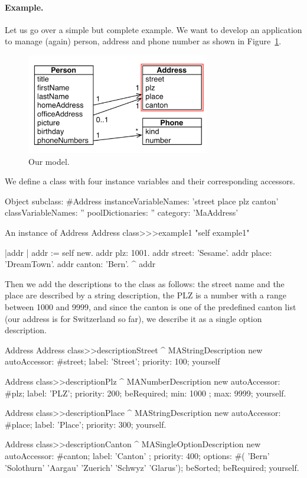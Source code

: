 \documentclass[a4paper,10pt,twoside]{book}
\begin{document}
\paragraph{Example.} Let us go over a simple but complete example. We want to develop an application to manage (again) person, address and phone number as shown in Figure~\ref{fig:address}. 

\begin{figure}
\begin{center}
\includegraphics[width=8cm]{address}
\caption{Our model. \label{fig:address}}
\end{center}
\end{figure}

We define a class  with four instance variables and their corresponding accessors. 

\begin{classdef}{}
Object subclass: #Address
	instanceVariableNames: 'street place plz canton'
	classVariableNames: ''
	poolDictionaries: ''
	category: 'MaAddress'
\end{classdef}

\begin{method}{An instance of Address}
Address class>>>example1
	"self example1"

	|addr | 
	addr := self new.
	addr plz: 1001.
	addr street: 'Sesame'.
	addr place: 'DreamTown'.
	addr canton: 'Bern'.
	^ addr
\end{method}


Then we add the descriptions to the  class as follows: the street name and the place are  described by a string description, the PLZ is a number with a range between 1000 and 9999,  and since the canton is one of the predefined canton list (our address is for Switzerland so far), we describe it as a single option description. 

\begin{code}{Address}
Address class>>descriptionStreet
	^ MAStringDescription new 
			autoAccessor: #street;
			label: 'Street';
			priority: 100; 
			yourself

Address class>>descriptionPlz
	^ MANumberDescription new 
		autoAccessor: #plz;
		label: 'PLZ';
		priority: 200; 
		beRequired;
		min: 1000 ; 
		max: 9999;
		yourself.

Address class>>descriptionPlace
	^ MAStringDescription new
		autoAccessor: #place;
		label: 'Place'; 
		priority: 300; 
		yourself.

Address class>>descriptionCanton
	^ MASingleOptionDescription new
			autoAccessor: #canton;
			label: 'Canton' ; 
			priority: 400;
			options: #( 'Bern' 'Solothurn' 'Aargau' 'Zuerich' 'Schwyz' 'Glarus');
			beSorted;
			beRequired; 
			yourself.
\end{code}
\end{document}
